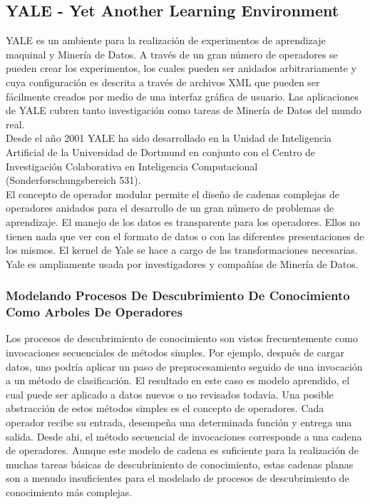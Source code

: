 \subsection{YALE - Yet Another Learning Environment}

YALE \cite{yalew, yalep} es un ambiente para la realizaci\'on de experimentos de aprendizaje maquinal y Miner\'ia
de Datos.  A trav\'es de un gran n\'umero de operadores se pueden crear los experimentos, los cuales pueden ser
anidados arbitrariamente y cuya configuraci\'on es descrita a trav\'es de archivos XML que pueden ser
f\'acilmente creados por medio de una interfaz gr\'afica de usuario.  Las aplicaciones de YALE cubren tanto
investigaci\'on como tareas de Miner\'ia de Datos del mundo real.\\

Desde el a\~no 2001 YALE ha sido desarrollado en la Unidad de Inteligencia Artificial de la Universidad de
Dortmund \cite{dort} en conjunto con el Centro de Investigaci\'on Colaborativa en Inteligencia Computacional
(Sonderforschungsbereich 531).\\

El concepto de operador modular permite el dise\~no de cadenas complejas de operadores anidados para el
desarrollo de un gran n\'umero de problemas de aprendizaje. El manejo de los datos es transparente para los
operadores. Ellos no tienen nada que ver con el formato de datos o con las diferentes presentaciones de los
mismos. El kernel de Yale se hace a cargo de las transformaciones necesarias.  Yale es ampliamente usada por
investigadores y compa\~n\'ias de Miner\'ia de Datos.

\subsubsection{Modelando Procesos De Descubrimiento De Conocimiento Como Arboles De Operadores}

Los procesos de descubrimiento de conocimiento son vistos frecuentemente como invocaciones secuenciales de
m\'etodos simples.  Por ejemplo, des\-pu\'es de cargar datos, uno podr\'ia aplicar un paso de preprocesamiento
seguido de una invocaci\'on a un m\'etodo de clasificaci\'on.  El resultado en este caso es modelo aprendido,
el cual puede ser aplicado a datos nuevos o no revisados todav\'ia.  Una posible abstracci\'on de estos m\'etodos
simples es el concepto de operadores. Cada operador recibe su entrada, desempe\~na una determinada funci\'on y
entrega una salida. Desde ahi, el m\'etodo secuencial de invocaciones corresponde a una cadena de operadores. 
Aunque este modelo de cadena es suficiente para la realizaci\'on de muchas tareas b\'asicas de descubrimiento de
conocimiento,  estas cadenas planas son a menudo insuficientes para el mo\-delado de procesos de descubrimiento de
conocimiento m\'as complejas.\\

